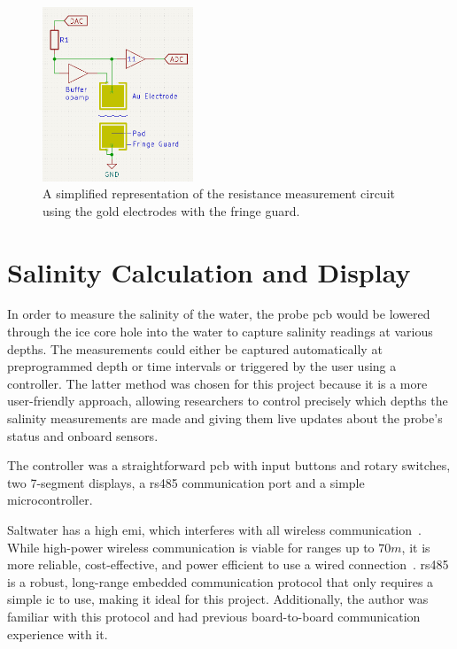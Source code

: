 \begin{figure}[ht]
    \centering
    \includegraphics[width=0.4\textwidth]{Figures/AuElectrodeExample}
    \caption{A simplified representation of the resistance measurement circuit using the gold electrodes with the fringe guard.}
    \label{fig:au-measurement-circuit} %
\end{figure}

\section{Salinity Calculation and Display}

In order to measure the salinity of the water, the probe \gls{pcb} would be lowered through the ice core hole into the water to capture salinity readings at various depths.
The measurements could either be captured automatically at preprogrammed depth or time intervals or triggered by the user using a controller.
The latter method was chosen for this project because it is a more user-friendly approach, allowing researchers to control precisely which depths the salinity measurements are made and giving them live updates about the probe's status and onboard sensors.

The controller was a straightforward \gls{pcb} with input buttons and rotary switches, two 7-segment displays, a \gls{rs485} communication port and a simple microcontroller.

Saltwater has a high \gls{emi}, which interferes with all wireless communication~\cite{pozzebon_near_field_communication_under_water_2015}.
While high-power wireless communication is viable for ranges up to $70m$, it is more reliable, cost-effective, and power efficient to use a wired connection~\cite{bergmann_wireless_underwater_data_transfer_2013}. 
\gls{rs485} is a robust, long-range embedded communication protocol that only requires a simple \gls{ic} to use, making it ideal for this project.
Additionally, the author was familiar with this protocol and had previous board-to-board communication experience with it.

